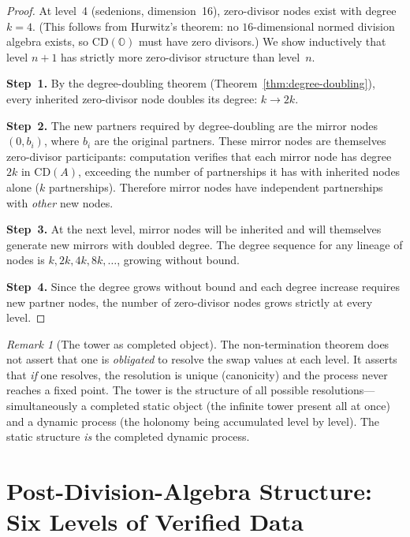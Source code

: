 \documentclass[12pt,a4paper]{article}
\theoremstyle{definition}
\theoremstyle{remark}
\newtheorem{remark}[theorem]{Remark}
\newcommand{\OO}{\mathbb{O}}
\newcommand{\CD}{\mathrm{CD}}
\begin{document}
\begin{proof}
At level~4 (sedenions, dimension~16), zero-divisor nodes exist
with degree $k = 4$. (This follows from Hurwitz's theorem: no
$16$-dimensional normed division algebra exists, so $\CD(\OO)$
must have zero divisors.) We show inductively that level $n+1$
has strictly more zero-divisor structure than level~$n$.

\textbf{Step~1.} By the degree-doubling theorem
(Theorem~\ref{thm:degree-doubling}), every inherited zero-divisor
node doubles its degree: $k \to 2k$.

\textbf{Step~2.} The new partners required by degree-doubling
are the mirror nodes $(0, b_i)$, where $b_i$ are the original
partners. These mirror nodes are themselves zero-divisor
participants: computation verifies that each mirror node has
degree $2k$ in $\CD(A)$, exceeding the number of partnerships
it has with inherited nodes alone ($k$ partnerships). Therefore
mirror nodes have independent partnerships with \emph{other} new
nodes.

\textbf{Step~3.} At the next level, mirror nodes will be
inherited and will themselves generate new mirrors with doubled
degree. The degree sequence for any lineage of nodes is
$k, 2k, 4k, 8k, \ldots$, growing without bound.

\textbf{Step~4.} Since the degree grows without bound and each
degree increase requires new partner nodes, the number of
zero-divisor nodes grows strictly at every level.
\end{proof}

\begin{remark}[The tower as completed object]
The non-termination theorem does not assert that one is
\emph{obligated} to resolve the swap values at each level. It
asserts that \emph{if} one resolves, the resolution is unique
(canonicity) and the process never reaches a fixed point. The
tower is the structure of all possible resolutions---simultaneously
a completed static object (the infinite tower present all at once)
and a dynamic process (the holonomy being accumulated level by
level). The static structure \emph{is} the completed dynamic
process.
\end{remark}


\section{Post-Division-Algebra Structure: Six Levels of
  Verified Data}
\label{sec:post-NDA}
\end{document}
